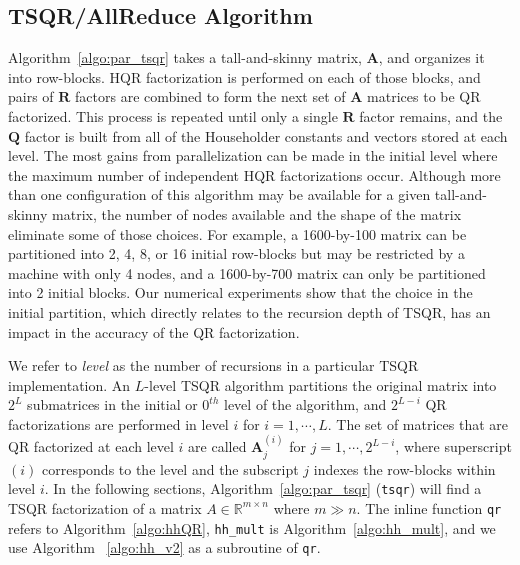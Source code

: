 \documentclass[review,onefignum,onetabnum]{siamart190516}
\newcommand{\R}{\mathbb{R}}
\newcommand{\bb}[1]{\mathbf{#1}}
\begin{document}
	\subsection{TSQR/AllReduce Algorithm}
		Algorithm~\ref{algo:par_tsqr} takes a tall-and-skinny matrix, $\bb{A}$, and organizes it into row-blocks. 
		HQR factorization is performed on each of those blocks, and pairs of $\bb{R}$ factors are combined  to form the next set of $\bb{A}$ matrices to be QR factorized. 
		This process is repeated until only a single $\bb{R}$ factor remains, and the $\bb{Q}$ factor is built from all of the Householder constants and vectors stored at each level.
		The most gains from parallelization can be made in the initial level where the maximum number of independent HQR factorizations occur. 
		Although more than one configuration of this algorithm may be available for a given tall-and-skinny matrix, the number of nodes available and the shape of the matrix eliminate some of those choices. 
		For example, a 1600-by-100 matrix can be partitioned into 2, 4, 8, or 16 initial row-blocks but may be restricted by a machine with only 4 nodes, and a 1600-by-700 matrix can only be partitioned into 2 initial blocks.
		Our numerical experiments show that the choice in the initial partition, which directly relates to the recursion depth of TSQR, has an impact in the accuracy of the QR factorization. \par
		
		We refer to \emph{level} as the number of recursions in a particular TSQR implementation. 
		An $L$-level TSQR algorithm partitions the original matrix into $2^L$ submatrices in the initial or $0^{th}$ level of the algorithm, and $2^{L-i}$ QR factorizations are performed in level $i$ for $i = 1 , \cdots, L$. 
		The set of matrices that are QR factorized at each level $i$ are called $\bb{A}_j^{(i)}$ for $j = 1, \cdots, 2^{L-i}$, where superscript $(i)$ corresponds to the level and the subscript $j$ indexes the row-blocks within level $i$.
		In the following sections, Algorithm~\ref{algo:par_tsqr} ({\tt tsqr}) will find a TSQR factorization of a matrix $A\in\R^{m\times n}$ where $m \gg n$. 
		The inline function {\tt qr} refers to Algorithm~\ref{algo:hhQR}, {\tt hh\_mult} is Algorithm~\ref{algo:hh_mult}, and we use Algorithm ~\ref{algo:hh_v2} as a subroutine of {\tt qr}.
\end{document}

